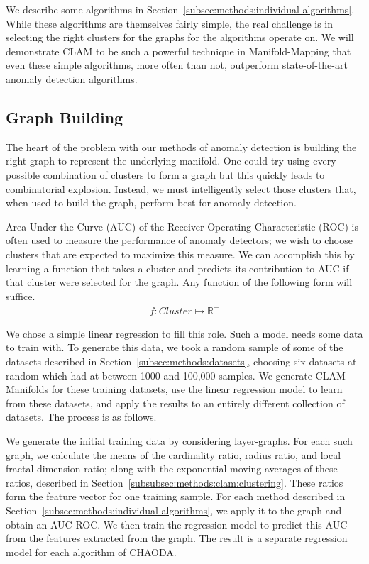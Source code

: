 We describe some algorithms in Section~\ref{subsec:methods:individual-algorithms}.
While these algorithms are themselves fairly simple, the real challenge is in selecting the right clusters for the graphs for the algorithms operate on.
We will demonstrate CLAM to be such a powerful technique in Manifold-Mapping that even these simple algorithms, more often than not, outperform state-of-the-art anomaly detection algorithms.

\subsection{Graph Building}
\label{subsec:methods:graph-building}
The heart of the problem with our methods of anomaly detection is building the right graph to represent the underlying manifold.
One could try using every possible combination of clusters to form a graph but this quickly leads to combinatorial explosion.
Instead, we must intelligently select those clusters that, when used to build the graph, perform best for anomaly detection.

Area Under the Curve (AUC) of the Receiver Operating Characteristic (ROC) is often used to measure the performance of anomaly detectors;
we wish to choose clusters that are expected to maximize this measure.
We can accomplish this by learning a function that takes a cluster and predicts its contribution to AUC if that cluster were selected for the graph.
Any function of the following form will suffice.
\begin{gather*}
    f: Cluster \mapsto \mathbb{R}^+
\end{gather*}

We chose a simple linear regression to fill this role.
Such a model needs some data to train with.
To generate this data, we took a random sample of some of the datasets described in Section~\ref{subsec:methods:datasets}, choosing six datasets at random which had at between 1000 and 100,000 samples.
We generate CLAM Manifolds for these training datasets, use the linear regression model to learn from these datasets, and apply the results to an entirely different collection of datasets. The process is as follows.

We generate the initial training data by considering layer-graphs.
For each such graph, we calculate the means of the cardinality ratio, radius ratio, and local fractal dimension ratio;
along with the exponential moving averages of these ratios, described in Section~\ref{subsubsec:methods:clam:clustering}.
These ratios form the feature vector for one training sample.
For each method described in Section~\ref{subsec:methods:individual-algorithms}, we apply it to the graph and obtain an AUC ROC\@.
We then train the regression model to predict this AUC from the features extracted from the graph.
The result is a separate regression model for each algorithm of CHAODA.



